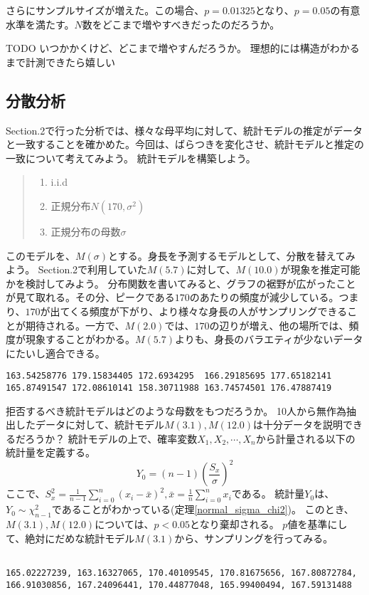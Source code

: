 \documentclass[a4paper,11pt,dvipdfmx]{jsarticle}
\begin{document}
さらにサンプルサイズが増えた。この場合、$p=0.01325$となり、$p=0.05$の有意水準を満たす。$N$数をどこまで増やすべきだったのだろうか。

TODO いつかかくけど、どこまで増やすんだろうか。
理想的には構造がわかるまで計測できたら嬉しい



\subsection{分散分析}
Section.2で行った分析では、様々な母平均に対して、統計モデルの推定がデータと一致することを確かめた。今回は、ばらつきを変化させ、統計モデルと推定の一致について考えてみよう。
統計モデルを構築しよう。
\begin{quote}
    \begin{enumerate}[(1)]
\item i.i.d
\item 正規分布$N(170,\sigma^2)$
\item 正規分布の母数$\sigma$
\end{enumerate}
\end{quote}
このモデルを、$M(\sigma)$とする。身長を予測するモデルとして、分散を替えてみよう。
Section.2で利用していた$M(5.7)$に対して、$M(10.0)$が現象を推定可能かを検討してみよう。
分布関数を書いてみると、グラフの裾野が広がったことが見て取れる。その分、ピークである$170$のあたりの頻度が減少している。つまり、$170$が出てくる頻度が下がり、より様々な身長の人がサンプリングできることが期待される。一方で、$M(2.0)$では、$170$の辺りが増え、他の場所では、頻度が現象することがわかる。$M(5.7)$よりも、身長のバラエティが少ないデータにたいし適合できる。


\begin{lstlisting}
163.54258776 179.15834405 172.6934295  166.29185695 177.65182141 165.87491547 172.08610141 158.30711988 163.74574501 176.47887419
\end{lstlisting}




拒否するべき統計モデルはどのような母数をもつだろうか。
10人から無作為抽出したデータに対して、統計モデル$M(3.1),M(12.0)$は十分データを説明できるだろうか？
統計モデルの上で、確率変数$X_1,X_2,\cdots,X_n$から計量される以下の統計量を定義する。
$$
Y_0=(n-1)\left(\frac{S_x}{\sigma}\right)^2
$$
ここで、$S_x^2=\frac{1}{n-1}\sum_{i=0}^{n}(x_i-\bar{x})^2,\bar{x}=\frac{1}{n}\sum_{i=0}^{n}x_i$である。
統計量$Y_0$は、$Y_0\sim\chi^2_{n-1}$であることがわかっている(定理\ref{normal_sigma_chi2})。
このとき、$M(3.1),M(12.0)$については、$p<0.05$となり棄却される。
$p$値を基準にして、絶対にだめな統計モデル$M(3.1)$から、サンプリングを行ってみる。
\begin{lstlisting}

165.02227239, 163.16327065, 170.40109545, 170.81675656, 167.80872784, 166.91030856, 167.24096441, 170.44877048, 165.99400494, 167.59131488
\end{lstlisting}
\end{document}
